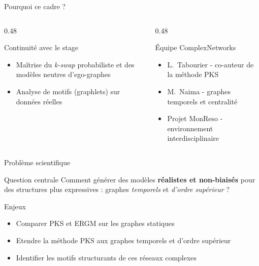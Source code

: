 \documentclass[aspectratio=169, 12pt]{beamer}
\newcommand{\kswap}{\textit{k-swap}}
\newcommand{\highlight}[1]{\textbf{\textcolor{LIP6teal}{#1}}}
\begin{document}
\begin{frame}{Pourquoi ce cadre ?}
  \begin{columns}[T]
    \begin{column}{0.48\textwidth}
      \begin{block}{Continuité avec le stage}
        \begin{itemize}
          \item Maîtrise du \kswap{} probabiliste et des modèles neutres
                d'ego-graphes
          \item Analyse de motifs (graphlets) sur données réelles
        \end{itemize}
      \end{block}
    \end{column}
    \begin{column}{0.48\textwidth}
      \begin{exampleblock}{Équipe ComplexNetworks}
        \begin{itemize}
          \item L.~Tabourier - co-auteur de la méthode PKS \cite{tabourier2024}
          \item M.~Naima - graphes temporels et centralité \cite{naima2023}
          \item Projet MonReso - environnement interdisciplinaire
        \end{itemize}
      \end{exampleblock}
    \end{column}
  \end{columns}
\end{frame}


\begin{frame}{Problème scientifique}
  \begin{alertblock}{Question centrale}
    Comment générer des modèles \highlight{réalistes et non-biaisés} pour des structures
    plus expressives : graphes \emph{temporels} et \emph{d'ordre supérieur} ?
  \end{alertblock}

  \bigskip

  \begin{block}{Enjeux}
    \begin{itemize}
      \item Comparer PKS et ERGM sur les graphes statiques
      \item Etendre la méthode PKS aux graphes temporels et d'ordre supérieur
      \item Identifier les motifs structurants de ces réseaux complexes
    \end{itemize}
  \end{block}
\end{frame}
\end{document}
